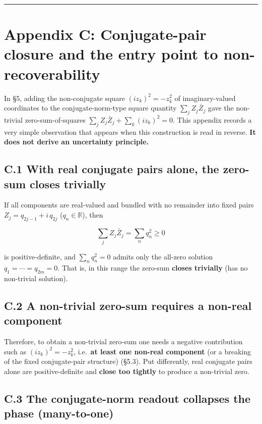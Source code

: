 \documentclass[11pt,a4paper]{article}
\begin{document}
\begin{center}\rule{0.5\linewidth}{0.5pt}\end{center}

\section{Appendix C: Conjugate-pair closure and the entry point to
non-recoverability}\label{appendix-c-conjugate-pair-closure-and-the-entry-point-to-non-recoverability}

In §5, adding the non-conjugate square \((i z_k)^2=-z_k^2\) of
imaginary-valued coordinates to the conjugate-norm-type square quantity
\(\sum_j Z_j\bar Z_j\) gave the non-trivial zero-sum-of-squares
\(\sum_j Z_j\bar Z_j+\sum_k (i z_k)^2=0\). This appendix records a very
simple observation that appears when this construction is read in
reverse. \textbf{It does not derive an uncertainty principle.}

\subsection{C.1 With real conjugate pairs alone, the zero-sum closes
trivially}\label{c.1-with-real-conjugate-pairs-alone-the-zero-sum-closes-trivially}

If all components are real-valued and bundled with no remainder into
fixed pairs \(Z_j=q_{2j-1}+i\,q_{2j}\) (\(q_n\in\mathbb{R}\)), then

\[
\sum_j Z_j\bar Z_j=\sum_n q_n^2\ge0
\]

is positive-definite, and \(\sum_n q_n^2=0\) admits only the all-zero
solution \(q_1=\cdots=q_{2m}=0\). That is, in this range the zero-sum
\textbf{closes trivially} (has no non-trivial solution).

\subsection{C.2 A non-trivial zero-sum requires a non-real
component}\label{c.2-a-non-trivial-zero-sum-requires-a-non-real-component}

Therefore, to obtain a non-trivial zero-sum one needs a negative
contribution such as \((i z_k)^2=-z_k^2\), i.e.~\textbf{at least one
non-real component} (or a breaking of the fixed conjugate-pair
structure) (§5.3). Put differently, real conjugate pairs alone are
positive-definite and \textbf{close too tightly} to produce a
non-trivial zero.

\subsection{C.3 The conjugate-norm readout collapses the phase
(many-to-one)}\label{c.3-the-conjugate-norm-readout-collapses-the-phase-many-to-one}
\end{document}
